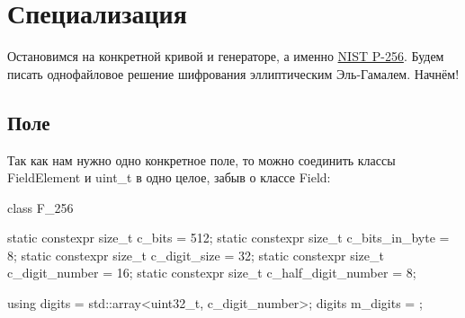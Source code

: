 
\section{Специализация}
Остановимся на конкретной кривой и генераторе, а именно \href{https://neuromancer.sk/std/nist/P-256}{NIST P-256}. Будем писать однофайловое решение шифрования эллиптическим Эль-Гамалем. Начнём!

\subsection{Поле}
Так как нам нужно одно конкретное поле, то можно соединить классы FieldElement и uint\_t в одно целое, забыв о классе Field:
\begin{cppcode}
class F_256 {
    static constexpr size_t c_bits = 512;
    static constexpr size_t c_bits_in_byte = 8;
    static constexpr size_t c_digit_size = 32;
    static constexpr size_t c_digit_number = 16;
    static constexpr size_t c_half_digit_number = 8;

    using digits = std::array<uint32_t, c_digit_number>;
    digits m_digits = {};
}
\end{cppcode}
